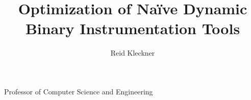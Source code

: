 \documentclass[twoside,leftblank,mitcopyright]{mengthesis}
\begin{document}


\title{Optimization of Na\"ive Dynamic Binary Instrumentation Tools}


\author{Reid Kleckner}







           {Professor of Computer Science and Engineering}



\maketitle

\end{document}

